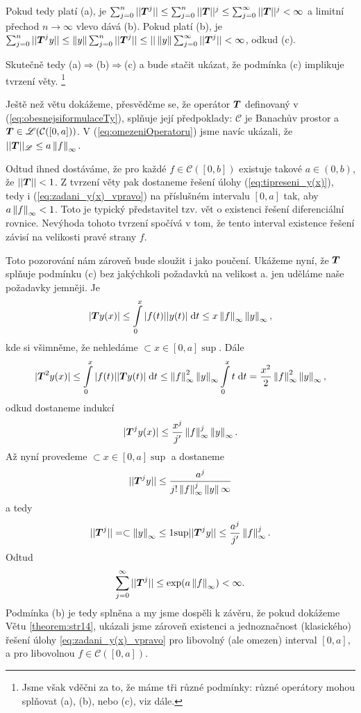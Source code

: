 Pokud tedy platí (a), je $\sum_{j=0}^n|| \boldsymbol{T} ^j||\leq\sum_{j=0}^n|| \boldsymbol{T} ||^j\leq \sum_{j=0}^\infty|| \boldsymbol{T} ||^j<\infty$ a limitní přechod $n\rightarrow \infty$ vlevo dává (b). Pokud platí (b), je $\sum_{j=0}^n|| \boldsymbol{T} ^jy||\leq\left\lVert y\right\rVert\sum_{j=0}^n|| \boldsymbol{T} ^j||\leq||\left\lVert y\right\rVert\sum_{j=0}^\infty|| \boldsymbol{T} ^j||<\infty$, odkud (c).

Skutečně tedy (a)$\Rightarrow$(b)$\Rightarrow$(c) a bude stačit ukázat, že podmínka (c) implikuje tvrzení věty. \footnote{Jsme však vděčni za to, že máme tři různé podmínky: různé operátory mohou splňovat (a), (b), nebo (c), viz dále.}
\item Ještě než větu dokážeme, přesvědčme se, že operátor $ \boldsymbol{T} $ definovaný v (\ref{eq:obesnejsiformulaceTy}), splňuje její předpoklady: $\mathcal{C}$ je Banachův prostor a $ \boldsymbol{T} \in\mathscr{L}(\mathcal{C}([0,a]))$. V (\ref{eq:omezeniOperatoru}) jsme navíc ukázali, že $|| \boldsymbol{T} ||_{\mathscr{L}}\leq a\left\lVert f\right\rVert_\infty.$

Odtud ihned dostáváme, že pro každé $f\in\mathcal{C}([0,b])$ existuje takové
$a\in (0,b)$, že $|| \boldsymbol{T} ||<1$.
Z tvrzení věty pak dostaneme  řešení úlohy (\ref{eq:tipreseni_y(x)}), tedy i (\ref{eq:zadani_y(x)_vpravo}) na příslušném  intervalu $[0,a]$
tak, aby $a\left\lVert f\right\rVert_\infty<1$. Toto je typický představitel tzv. vět o  existenci řešení diferenciální rovnice. Nevýhoda tohoto tvrzení spočívá v tom, že tento interval existence řešení závisí na velikosti pravé strany $f$.

Toto pozorování nám zároveň bude sloužit i jako poučení. Ukážeme nyní, že $ \boldsymbol{T} $ splňuje podmínku (c) bez jakýchkoli požadavků na velikost a. jen uděláme naše požadavky jemněji. Je 
$$| \boldsymbol{T} y(x)|\leq \int\limits_0^x|f(t)||y(t)|\;\mathrm{d}t\leq x\left\lVert f\right\rVert_\infty\left\lVert y\right\rVert_\infty,$$
kde si všimněme, že nehledáme $\subset{x\in[0,a]}{\sup}$. Dále
$$| \boldsymbol{T} ^2y(x)|\leq\int\limits_0^x|f(t)|| \boldsymbol{T} y(t)|\;\mathrm{d}t\leq \left\lVert f\right\rVert^2_\infty\left\lVert y\right\rVert_\infty\int\limits_0^xt\;\mathrm{d}t = \frac{x^2}{2}\left\lVert f\right\rVert^2_\infty\left\lVert y\right\rVert_\infty,$$
odkud dostaneme indukcí
$$| \boldsymbol{T} ^jy(x)|\leq\frac{x^j}{j'}\left\lVert f\right\rVert^j_\infty\left\lVert y\right\rVert_\infty.$$
Až nyní provedeme $\subset{x\in[0,a]}{\sup}$ a dostaneme 
$$|| \boldsymbol{T} ^jy||\leq\frac{a^j}{j!\left\lVert f\right\rVert^j_\infty\left\lVert y\right\rVert\infty}$$ a tedy 
$$|| \boldsymbol{T} ^j||=\subset{\left\lVert y\right\rVert_\infty\leq 1}{\sup}|| \boldsymbol{T} ^jy||\leq\frac{a^j}{j'}\left\lVert f\right\rVert^j_\infty.$$
Odtud $$\sum\limits_{j=0}^\infty|| \boldsymbol{T} ^j||\leq\exp(a\left\lVert f\right\rVert_\infty)<\infty.$$
Podmínka (b) je tedy splněna a my jsme dospěli k závěru, že pokud dokážeme Větu \ref{theorem:str14}, ukázali jsme zároveň existenci a jednoznačnost (klasického) řešení úlohy \ref{eq:zadani_y(x)_vpravo} pro libovolný (ale omezen) interval $[0,a]$, a pro libovolnou $f\in\mathcal{C}([0,a])$.

